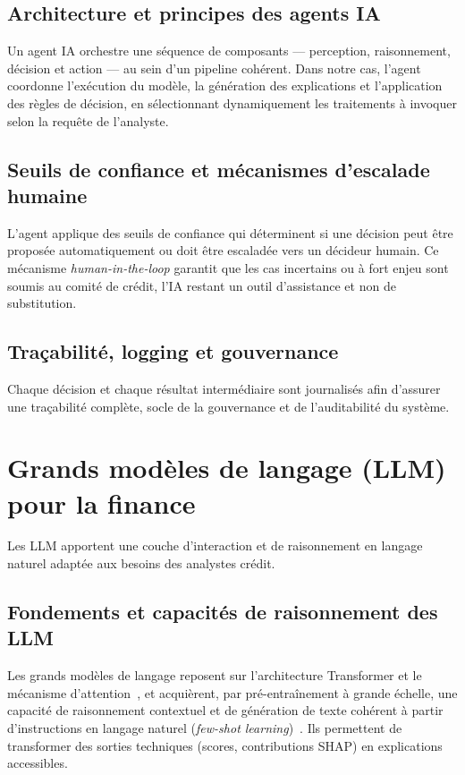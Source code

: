 \documentclass[a4paper,12pt,oneside]{report}
\begin{document}
\subsection{Architecture et principes des agents IA}

Un agent IA orchestre une séquence de composants — perception, raisonnement, décision et
action — au sein d'un pipeline cohérent. Dans notre cas, l'agent coordonne l'exécution du
modèle, la génération des explications et l'application des règles de décision, en sélectionnant
dynamiquement les traitements à invoquer selon la requête de l'analyste.

\subsection{Seuils de confiance et mécanismes d'escalade humaine}

L'agent applique des seuils de confiance qui déterminent si une décision peut être proposée
automatiquement ou doit être escaladée vers un décideur humain. Ce mécanisme
\textit{human-in-the-loop} garantit que les cas incertains ou à fort enjeu sont soumis au
comité de crédit, l'IA restant un outil d'assistance et non de substitution.

\subsection{Traçabilité, logging et gouvernance}

Chaque décision et chaque résultat intermédiaire sont journalisés afin d'assurer une
traçabilité complète, socle de la gouvernance et de l'auditabilité du système.

\section{Grands modèles de langage (LLM) pour la finance}

Les LLM apportent une couche d'interaction et de raisonnement en langage naturel adaptée
aux besoins des analystes crédit.

\subsection{Fondements et capacités de raisonnement des LLM}

Les grands modèles de langage reposent sur l'architecture Transformer et le mécanisme
d'attention~\cite{vaswani2017}, et acquièrent, par pré-entraînement à grande échelle, une
capacité de raisonnement contextuel et de génération de texte cohérent à partir d'instructions
en langage naturel (\textit{few-shot learning})~\cite{brown2020}. Ils permettent de transformer
des sorties techniques (scores, contributions SHAP) en explications accessibles.
\end{document}
